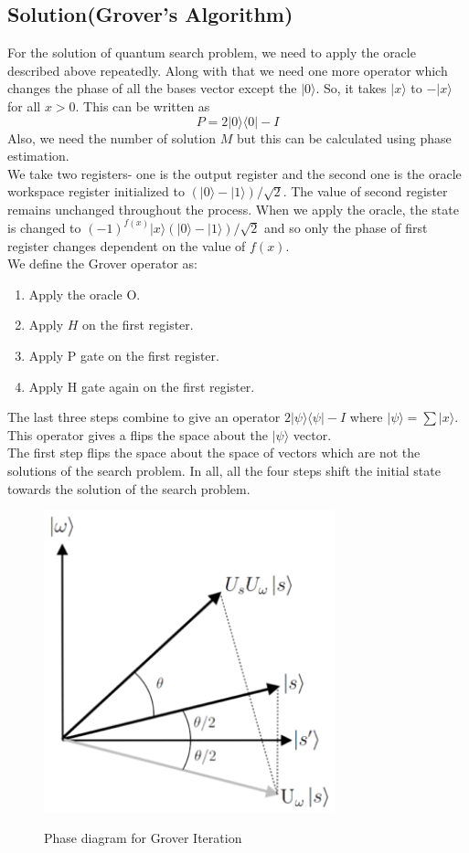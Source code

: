 \subsection{Solution(Grover's Algorithm)}
For the solution of quantum search problem, we need to apply the oracle described above repeatedly. Along with that we need one more operator which changes the phase of all the bases vector except the $|0\rangle$. So, it takes $|x\rangle$ to $-|x\rangle$ for all $x>0$. This can be written as $$P = 2|0\rangle \langle0| - I$$ Also, we need the number of solution $M$ but this can be calculated using phase estimation.\\
We take two registers- one is the output register and the second one is the oracle workspace register initialized to $(|0\rangle - |1\rangle) / \sqrt{2}$. The value of second register remains unchanged throughout the process. When we apply the oracle, the state is changed to $(-1)^{f(x)} |x\rangle (|0\rangle - |1\rangle )/\sqrt{2}$ and so only the phase of first register changes dependent on the value of $f(x)$.\\
We define the Grover operator as:
\begin{enumerate}
\item Apply the oracle O.
\item Apply $H$ on the first register.
\item Apply P gate on the first register.
\item Apply H gate again on the first register.
\end{enumerate}
The last three steps combine to give an operator $2|\psi\rangle \langle \psi | - I$ where $|\psi \rangle  = \sum |x\rangle$. This operator gives a flips the space about the $|\psi\rangle$ vector.\\
The first step flips the space about the space of vectors which are not the solutions of the search problem. In all, all the four steps shift the initial state towards the solution of the search problem. 
\begin{figure}[h]
\centering
\includegraphics[width=0.75\textwidth]{images/grover.png}
\label{grover}
\caption{Phase diagram for Grover Iteration}
\end{figure}
